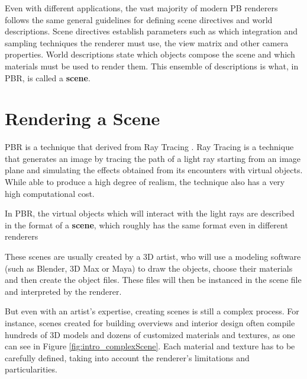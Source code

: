 Even with different applications, the vast majority of modern PB renderers 
follows the same general guidelines for defining scene directives and world 
descriptions. Scene directives establish parameters such as which integration 
and sampling techniques the renderer must use, the view matrix and other camera 
properties. World descriptions state which objects compose the scene and which 
materials must be used to render them. This ensemble of descriptions is what, in 
PBR, is called a \textbf{scene}.

\section{Rendering a Scene}
PBR is a technique that derived from Ray Tracing \cite{raytracing}. Ray Tracing 
is a technique that generates an image by tracing the path of a light ray 
starting from an image plane and simulating the effects obtained from its 
encounters with virtual objects. While able to produce a high degree of realism,
the technique also has a very high computational cost.

In PBR, the virtual objects which will interact with the light rays are 
described in the format of a \textbf{scene}, which roughly has the same format even in 
different renderers

These scenes are usually created by a 3D artist, who will use a modeling 
software (such as Blender, 3D Max or Maya) to draw the objects, choose their 
materials and then create the object files. These files will then be instanced 
in the scene file and interpreted by the renderer.

But even with an artist’s expertise, creating scenes is still a complex process. 
For instance, scenes created for building overviews and interior design often 
compile hundreds of 3D models and dozens of customized materials and textures, 
as one can see in Figure \ref{fig:intro_complexScene}. Each material and texture 
has to be carefully defined, taking into account the renderer's limitations and 
particularities.


